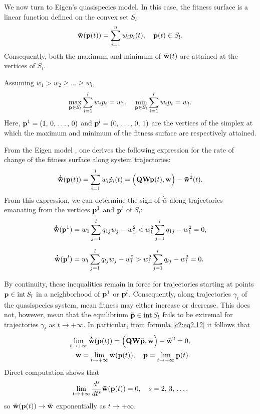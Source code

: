 \documentclass[12pt]{report}
\newcommand{\inside}{\mathrm{int}\,}
\theoremstyle{definition}
\theoremstyle{remark}
\begin{document}
\bigskip
We now turn to Eigen's quasispecies model. In this case, the fitness surface is a linear function defined on the convex set $S_{l}$:
$$
{\bf \bar{w}}({\bf p}(t)) = \sum\limits_{i = 1}^{n}w_{i}p_{i}(t), \quad {\bf p}(t) \in S_{l}.
$$
Consequently, both the maximum and minimum of ${\bf \bar{w}}(t)$ are attained at the vertices of $S_{l}$.

Assuming $w_{1} > w_{2} \geqslant \ldots \geqslant w_{l}$,
$$
\max_{{\bf p} \in S_{l}}\sum\limits_{i = 1}^{l}w_{i}p_{i} = w_{1}, \quad \min_{{\bf p} \in S_{l}}\sum\limits_{i = 1}^{l}w_{i}p_{i} = w_{l}.
$$
Here, ${\bf p}^{1} = (1,\, 0,\, \ldots,\, 0)$ and ${\bf p}^{l} = (0,\, \ldots,\, 0,\, 1)$ are the vertices of the simplex at which the maximum and minimum of the fitness surface are respectively attained.

From the Eigen model \cite{c2:Eigen1971}, one derives the following expression for the rate of change of the fitness surface along system trajectories:
\begin{equation}
	{\bf \dot{\bar{w}}}({\bf p}(t)) = \sum\limits_{i = 1}^{l}w_{i}\dot{p}_{i}(t) = \Big({\bf QWp}(t), {\bf w}\Big) - {\bf \bar{w}}^{2}(t).
	\label{c2:eq2.12}
\end{equation}
From this expression, we can determine the sign of $\dot{\bar{w}}$ along trajectories emanating from the vertices ${\bf p}^{1}$ and ${\bf p}^{l}$ of $S_{l}$:
\begin{align*}
    {\bf \dot{\bar{w}}}({\bf p}^{1}) 
        &= w_{1}\sum\limits_{j = 1}^{l}q_{1j}w_{j} - w_{1}^{2} 
        < w_{1}^{2}\sum\limits_{j = 1}^{l}q_{1j} - w_{1}^{2} = 0,\\[6pt]
    {\bf \dot{\bar{w}}}({\bf p}^{l}) 
        &= w_{l}\sum\limits_{j = 1}^{l}q_{lj}w_{j} - w_{l}^{2} 
        > w_{l}^{2}\sum\limits_{j = 1}^{l}q_{lj} - w_{l}^{2} = 0.
\end{align*}

By continuity, these inequalities remain in force for trajectories starting at points ${\bf p} \in \inside S_{l}$ in a neighborhood of ${\bf p}^{1}$ or ${\bf p}^{l}$. Consequently, along trajectories $\gamma_{t}$ of the quasispecies system, mean fitness may either increase or decrease. This does not, however, mean that the equilibrium ${\bf \bar{p}} \in \inside S_{l}$ fails to be extremal for trajectories $\gamma_{t}$ as $t \to +\infty$. In particular, from formula \eqref{c2:eq2.12} it follows that
\begin{align*}
	\lim\limits_{t \to +\infty}{\bf \dot{\bar{w}}}({\bf p}(t)) = \Big({\bf QW\bar{p}, w}\Big) - {\bf \bar{w}}^{2} = 0, \\
    {\bf \bar{w}} = \lim\limits_{t \to +\infty}{\bf \bar{w}(p}(t)),\quad {\bf \bar{p}} = \lim\limits_{t \to +\infty}{\bf p}(t).
\end{align*} 
Direct computation shows that
$$
\lim\limits_{t \to +\infty}\frac{d^s}{dt^{s}}{\bf \bar{w}(p}(t)) = 0, \quad s = 2,\, 3,\, \ldots,
$$
so ${\bf \bar{w}(p}(t)) \to {\bf \bar{w}}$ exponentially as $t \to +\infty$.
\end{document}
